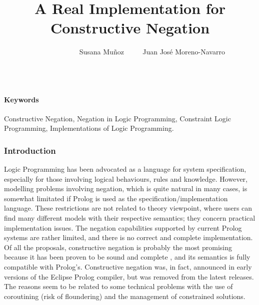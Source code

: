 \documentclass{llncs}
\begin{document}

\title{A Real Implementation for \\
       Constructive Negation}

\author{~~~~~~~~~~~~ Susana Mu\~{n}oz ~~~~ Juan Jos\'{e} Moreno-Navarro \\
 ~~~~~ }


\maketitle

\vspace{-12pt}

\paragraph{\bf Keywords}
Constructive Negation, Negation in Logic Programming, Constraint Logic
Programming, Implementations of Logic Programming.



\subsubsection{Introduction}
Logic Programming has been advocated as a language for system
  specification, especially for those involving logical behaviours,
  rules and knowledge. However, modelling problems involving negation,
  which is quite natural in many cases, is somewhat limitated if
  Prolog is used as the specification/implementation language. These
  restrictions are not related to theory viewpoint, where users can
  find many different models with their respective semantics; they
  concern practical implementation issues.  The negation capabilities
  supported by current Prolog systems are rather limited, and there is
  no correct and complete implementation. Of all the proposals,
  constructive negation \cite{Chan1,Chan2} is probably the most
  promising because it has been proven to be sound and complete
  \cite{Stuckey95}, and its semantics is fully compatible with
  Prolog's. Constructive negation was, in fact, announced in early
  versions of the Eclipse Prolog compiler, but was removed from the
  latest releases.  The reasons seem to be related to some technical
  problems with the use of coroutining (risk of floundering) and the
  management of constrained solutions.
\end{document}
